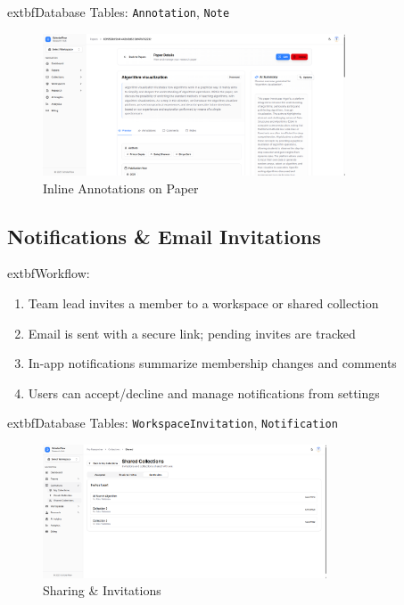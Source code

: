     extbf{Database Tables:} \texttt{Annotation}, \texttt{Note}

\begin{figure}[H]
\centering
\includegraphics[width=0.8\textwidth]{images/screenshots/paper_details_1.png}
\caption{Inline Annotations on Paper}
\label{fig:annotations}
\end{figure}

\subsection{Notifications \& Email Invitations}

    extbf{Workflow:}
\begin{enumerate}[leftmargin=*,topsep=3pt,itemsep=2pt]
    \item Team lead invites a member to a workspace or shared collection
    \item Email is sent with a secure link; pending invites are tracked
    \item In-app notifications summarize membership changes and comments
    \item Users can accept/decline and manage notifications from settings
\end{enumerate}

	extbf{Database Tables:} \texttt{WorkspaceInvitation}, \texttt{Notification}

\begin{figure}[H]
\centering
\includegraphics[width=0.75\textwidth]{images/screenshots/shared_collection.png}
\caption{Sharing \& Invitations}
\label{fig:notifications}
\end{figure}

